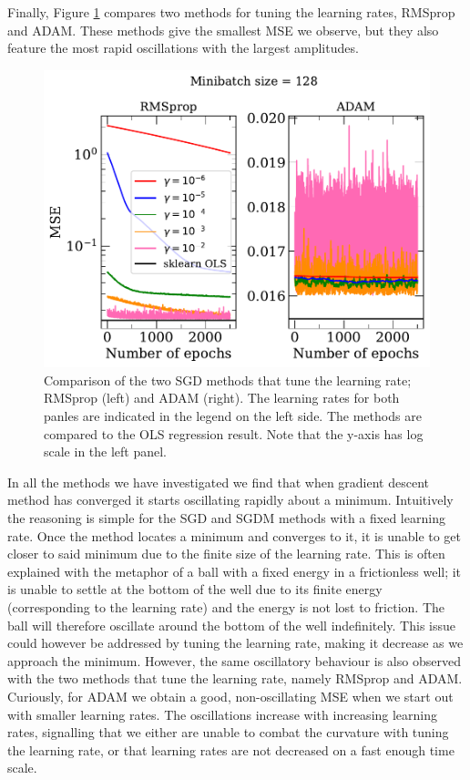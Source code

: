 \documentclass[a4paper,
amsfonts,
amssymb,
amsmath,
reprint,
showkeys,
nofootinbib,
twoside]{revtex4-2}
\begin{document}
Finally, Figure \ref{fig:tunerates} compares two methods for tuning the learning rates, RMSprop and ADAM. These methods give the smallest MSE we observe, but they also feature the most rapid oscillations with the largest amplitudes.

\begin{figure}
    \centering
    \includegraphics[width = \columnwidth]{Figures/tunerates_1.pdf}
    \caption{Comparison of the two SGD methods that tune the learning rate; RMSprop (left) and ADAM (right). The learning rates for both panles are indicated in the legend on the left side. The methods are compared to the OLS regression result. Note that the y-axis has log scale in the left panel.}
    \label{fig:tunerates}
\end{figure}

In all the methods we have investigated we find that when gradient descent method has converged it starts oscillating rapidly about a minimum. Intuitively the reasoning is simple for the SGD and SGDM methods with a fixed learning rate. Once the method locates a minimum and converges to it, it is unable to get closer to said minimum due to the finite size of the learning rate. This is often explained with the metaphor of a ball with a fixed energy in a frictionless well; it is unable to settle at the bottom of the well due to its finite energy (corresponding to the learning rate) and the energy is not lost to friction. The ball will therefore oscillate around the bottom of the well indefinitely. This issue could however be addressed by tuning the learning rate, making it decrease as we approach the minimum. However, the same oscillatory behaviour is also observed with the two methods that tune the learning rate, namely RMSprop and ADAM. Curiously, for ADAM we obtain a good, non-oscillating MSE when we start out with smaller learning rates. The oscillations increase with increasing learning rates, signalling that we either are unable to combat the curvature with tuning the learning rate, or that learning rates are not decreased on a fast enough time scale.
\end{document}
